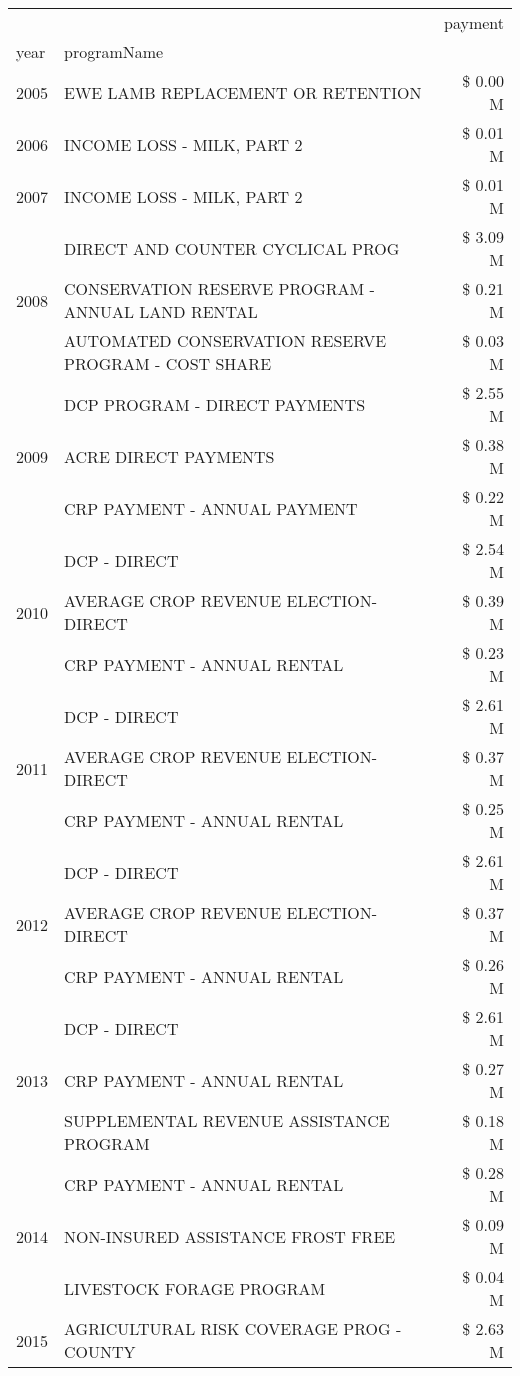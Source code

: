 \begin{tabular}{llr}
\toprule
 &  & payment \\
year & programName &  \\
\midrule
2005 & EWE LAMB REPLACEMENT OR RETENTION & \$ 0.00 M \\
\cline{1-3}
2006 & INCOME LOSS - MILK, PART 2 & \$ 0.01 M \\
\cline{1-3}
2007 & INCOME LOSS - MILK, PART 2 & \$ 0.01 M \\
\cline{1-3}
\multirow[t]{3}{*}{2008} & DIRECT AND COUNTER CYCLICAL PROG & \$ 3.09 M \\
 & CONSERVATION RESERVE PROGRAM - ANNUAL LAND RENTAL & \$ 0.21 M \\
 & AUTOMATED CONSERVATION RESERVE PROGRAM - COST SHARE & \$ 0.03 M \\
\cline{1-3}
\multirow[t]{3}{*}{2009} & DCP PROGRAM - DIRECT PAYMENTS & \$ 2.55 M \\
 & ACRE DIRECT PAYMENTS & \$ 0.38 M \\
 & CRP PAYMENT - ANNUAL PAYMENT & \$ 0.22 M \\
\cline{1-3}
\multirow[t]{3}{*}{2010} & DCP - DIRECT & \$ 2.54 M \\
 & AVERAGE CROP REVENUE ELECTION-DIRECT & \$ 0.39 M \\
 & CRP PAYMENT - ANNUAL RENTAL & \$ 0.23 M \\
\cline{1-3}
\multirow[t]{3}{*}{2011} & DCP - DIRECT & \$ 2.61 M \\
 & AVERAGE CROP REVENUE ELECTION-DIRECT & \$ 0.37 M \\
 & CRP PAYMENT - ANNUAL RENTAL & \$ 0.25 M \\
\cline{1-3}
\multirow[t]{3}{*}{2012} & DCP - DIRECT & \$ 2.61 M \\
 & AVERAGE CROP REVENUE ELECTION-DIRECT & \$ 0.37 M \\
 & CRP PAYMENT - ANNUAL RENTAL & \$ 0.26 M \\
\cline{1-3}
\multirow[t]{3}{*}{2013} & DCP - DIRECT & \$ 2.61 M \\
 & CRP PAYMENT - ANNUAL RENTAL & \$ 0.27 M \\
 & SUPPLEMENTAL REVENUE ASSISTANCE PROGRAM & \$ 0.18 M \\
\cline{1-3}
\multirow[t]{3}{*}{2014} & CRP PAYMENT - ANNUAL RENTAL & \$ 0.28 M \\
 & NON-INSURED ASSISTANCE FROST FREE & \$ 0.09 M \\
 & LIVESTOCK FORAGE PROGRAM & \$ 0.04 M \\
\cline{1-3}
\multirow[t]{3}{*}{2015} & AGRICULTURAL RISK COVERAGE PROG - COUNTY & \$ 2.63 M \\

\end{tabular}
